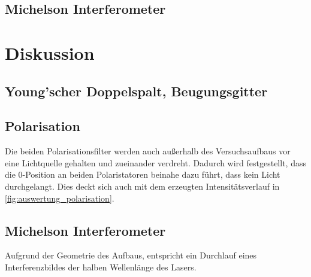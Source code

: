 \documentclass[12pt,english,ngerman]{scrartcl}
\begin{document}

\subsection{Michelson Interferometer}


\section{Diskussion}\label{sec:diskussion}

\subsection{Young'scher Doppelspalt, Beugungsgitter}


\subsection{Polarisation}

Die beiden Polarisationsfilter werden auch außerhalb des Versuchsaufbaus vor eine Lichtquelle gehalten und 
zueinander verdreht. Dadurch wird festgestellt, dass die 0-Position an beiden Polaristatoren beinahe dazu führt, dass 
kein Licht durchgelangt. Dies deckt sich auch mit dem erzeugten Intensitätsverlauf in \autoref{fig:auswertung_polarisation}.

\subsection{Michelson Interferometer}

Aufgrund der Geometrie des Aufbaus, entspricht ein Durchlauf eines Interferenzbildes der halben Wellenlänge des Lasers.
\end{document}
